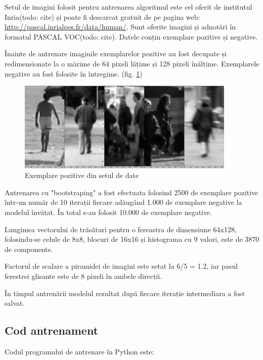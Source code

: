 Setul de imagini folosit pentru antrenarea algoritmul este cel oferit de institutul Inria(todo: cite) și poate fi descarcat gratuit de pe pagina web: \url{http://pascal.inrialpes.fr/data/human/}. 
Sunt oferite imagini și adnotări în formatul PASCAL VOC(todo: cite).
Datele conțin exemplare pozitive și negative.
%

Înainte de antrenare imaginile exemplarelor pozitive au fost decupate și redimensionate la o mărime de 64 pixeli lățime și 128 pixeli înălțime.
Exemplarele negative au fost folosite în întregime. (fig. \ref{fig:exemplare_pozitive_inria_person})

\begin{figure}[H]
	\centering
		\includegraphics[width=0.93\textwidth]{imagini/exemplare_pozitive_inria_person.png}
	\caption{Exemplare pozitive din setul de date}
	\label{fig:exemplare_pozitive_inria_person}
\end{figure}


Antrenarea cu "bootstraping" a fost efectuata folosind 2500 de exemplare pozitive într-un număr de 10 iterații fiecare adăugând 1.000 de exemplare negative la modelul învățat. În total s-au folosit 10.000 de exemplare negative.

Lungimea vectorului de trăsături pentru o fereastra de dimensiune 64x128, folosindu-se celule de 8x8, blocuri de 16x16 și histograma cu 9 valori, este de 3870 de componente.

Factorul de scalare a piramidei de imagini este setat la 6/5 = 1.2, iar pasul ferestrei glisante este de 8 pixeli în ambele direcții.

În timpul antrenării modelul rezultat după fiecare iterație intermediara a fost salvat.

\subsection{Cod antrenament}
Codul programului de antrenare în Python este:


